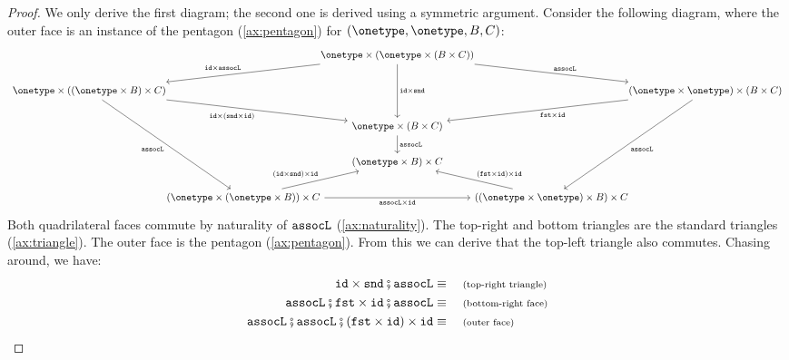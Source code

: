 \begin{proof}
    We only derive the first diagram; the second one is derived using a symmetric argument. Consider the following diagram, where the outer face is an instance of the pentagon (\cref{ax:pentagon}) for $(\onetype, \onetype, B, C)$:
    \[
    \begin{tikzcd}
        &[-3.2em]&[-3.2em]\onetype \times \left( \onetype \times \left( B \times C \right) \right)
        \ar[dll, "{\idterm \times \assoclterm}"']
        \ar[drr, "\assoclterm"]
        \ar[dd, "{\idterm \times \sndterm}"]
        \\ 
        \onetype \times \left( \left( \onetype \times B \right) \times C \right)
        \ar[dddr, "\assoclterm"']
        \ar[drr, "{\idterm \times \left( \sndterm \times \idterm \right)}"']
        &[-3.2em]&[-3.2em]&[-3.2em]&[-3.2em]\left( \onetype \times \onetype \right) \times \left( B \times C \right)
        \ar[dll, "{\fstterm \times \idterm}"]
        \ar[dddl, "\assoclterm"]
        \\ 
        &[-3.2em]&[-3.2em]\onetype \times \left( B \times C \right) 
        \ar[d, "\assoclterm"]
        \\ 
        &[-3.2em]&[-3.2em]\left( \onetype \times B \right) \times C 
        \\ 
        &[-3.2em]\left( \onetype \times \left( \onetype \times B \right) \right) \times C 
        \ar[rr, "{\assoclterm \times \idterm}"']
        \ar[ur, "{\left( \idterm \times \sndterm \right) \times \idterm}"]
        &[-3.2em]&[-3.2em]\left( \left( \onetype \times \onetype \right) \times B \right) \times C
        \ar[ul, "{\left(\fstterm \times \idterm \right) \times \idterm}"']
    \end{tikzcd}
    \]
    Both quadrilateral faces commute by naturality of $\mathtt{assocL}$ (\cref{ax:naturality}). The top-right and bottom triangles are the standard triangles (\cref{ax:triangle}). The outer face is the pentagon (\cref{ax:pentagon}). From this we can derive that the top-left triangle also commutes. Chasing around, we have:
    \begin{align*}
        \idterm \times \sndterm \comp \assoclterm \equalbecause{top-right triangle} \\ 
        \assoclterm \comp \fstterm \times \idterm \comp \assoclterm \equalbecause{bottom-right face} \\ 
        \assoclterm \comp \assoclterm \comp \left( \fstterm \times \idterm \right) \times \idterm \equalbecause{outer face} \\ 

\end{align*}
\end{proof}
